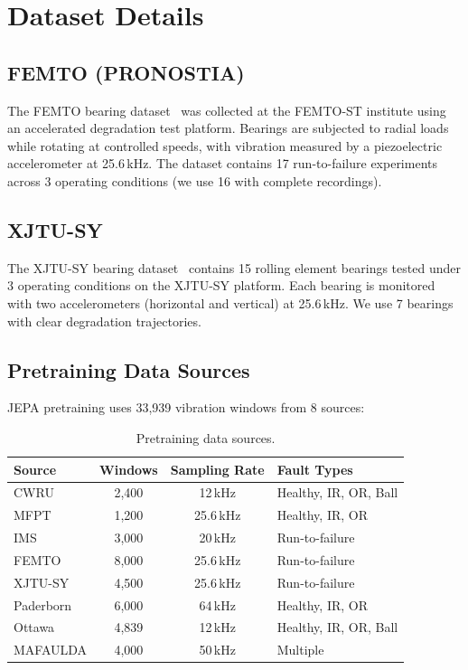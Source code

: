 \section{Dataset Details}
\label{app:datasets}

\subsection{FEMTO (PRONOSTIA)}

The FEMTO bearing dataset~\citep{nectoux2012pronostia} was collected at the FEMTO-ST institute using an accelerated degradation test platform. Bearings are subjected to radial loads while rotating at controlled speeds, with vibration measured by a piezoelectric accelerometer at 25.6\,kHz. The dataset contains 17 run-to-failure experiments across 3 operating conditions (we use 16 with complete recordings).

\subsection{XJTU-SY}

The XJTU-SY bearing dataset~\citep{wang2018xjtusybearing} contains 15 rolling element bearings tested under 3 operating conditions on the XJTU-SY platform. Each bearing is monitored with two accelerometers (horizontal and vertical) at 25.6\,kHz. We use 7 bearings with clear degradation trajectories.

\subsection{Pretraining Data Sources}

JEPA pretraining uses 33,939 vibration windows from 8 sources:

\begin{table}[h]
\centering
\caption{Pretraining data sources.}
\label{tab:pretrain_sources}
\small
\begin{tabular}{@{}lccl@{}}
\toprule
Source & Windows & Sampling Rate & Fault Types \\
\midrule
CWRU & 2,400 & 12\,kHz & Healthy, IR, OR, Ball \\
MFPT & 1,200 & 25.6\,kHz & Healthy, IR, OR \\
IMS & 3,000 & 20\,kHz & Run-to-failure \\
FEMTO & 8,000 & 25.6\,kHz & Run-to-failure \\
XJTU-SY & 4,500 & 25.6\,kHz & Run-to-failure \\
Paderborn & 6,000 & 64\,kHz & Healthy, IR, OR \\
Ottawa & 4,839 & 12\,kHz & Healthy, IR, OR, Ball \\
MAFAULDA & 4,000 & 50\,kHz & Multiple \\
\bottomrule
\end{tabular}
\end{table}


